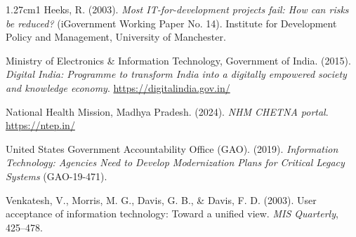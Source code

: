 \documentclass[11pt,a4paper]{article}
\begin{document}
\begin{hangparas}{1.27cm}{1}
\vspace{4pt}
Heeks, R. (2003). \textit{Most IT-for-development projects fail: How can
risks be reduced?} (iGovernment Working Paper No. 14).
Institute for Development Policy and Management, University of Manchester.

\vspace{4pt}
Ministry of Electronics \& Information Technology, Government of India. (2015).
\textit{Digital India: Programme to transform India into a digitally empowered society
and knowledge economy}. \url{https://digitalindia.gov.in/}

\vspace{4pt}
National Health Mission, Madhya Pradesh. (2024).
\textit{NHM CHETNA portal}. \url{https://ntep.in/}

\vspace{4pt}
United States Government Accountability Office (GAO). (2019). \textit{Information Technology: Agencies Need to Develop Modernization Plans for Critical Legacy Systems} (GAO-19-471).

\vspace{4pt}
Venkatesh, V., Morris, M. G., Davis, G. B., \& Davis, F. D. (2003). User acceptance of information technology: Toward a unified view. \textit{MIS Quarterly}, 425--478.

\end{hangparas}
\end{document}

